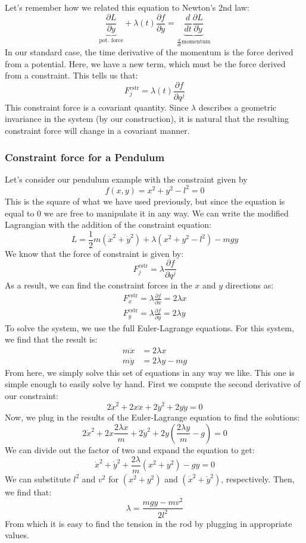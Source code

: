 Let's remember how we related this equation to Newton's 2nd law:
$$\underbrace{\frac{\partial L}{\partial y}}_\text{pot. force}+\lambda(t)\frac{\partial f}{\partial y}=\underbrace{\frac{d}{dt}\frac{\partial L}{\partial \dot{y}}}_{\frac{d}{dt}\text{momentum}}$$
In our standard case, the time derivative of the momentum is the force derived from a potential. Here, we have a new term, which must be the force derived from a constraint. This tells us that:
$$F^\text{cstr}_j=\lambda(t)\frac{\partial f}{\partial q^j}$$
This constraint force is a covariant quantity. Since $\lambda$ describes a geometric invariance in the system (by our construction), it is natural that the resulting constraint force will change in a covariant manner.

\subsubsection{Constraint force for a Pendulum}
Let's consider our pendulum example with the constraint given by
$$f(x,y)={x^2+y^2}-l^2=0$$
This is the square of what we have used previously, but since the equation is equal to 0 we are free to manipulate it in any way. We can write the modified \gls{Lagrangian} with the addition of the constraint equation:
$$L=\frac{1}{2}m(\dot{x}^2+\dot{y}^2)+\lambda(x^2+y^2-l^2)-mgy$$
We know that the force of constraint is given by:
$$F^\text{cstr}_j=\lambda\frac{\partial f}{\partial q^j}$$
As a result, we can find the constraint forces in the $x$ and $y$ directions as:
\begin{gather}
    F^\text{cstr}_x=\lambda\frac{\partial f}{\partial x}=2\lambda x\\
    F^\text{cstr}_y=\lambda\frac{\partial f}{\partial y}=2\lambda y
\end{gather}
To solve the system, we use the full Euler-Lagrange equations. For this system, we find that the result is:
\begin{align}
    m\ddot{x} &= 2\lambda x \\
    m\ddot{y} &= 2\lambda y-mg
\end{align}
From here, we simply solve this set of equations in any way we like. This one is simple enough to easily solve by hand. First we compute the second derivative of our constraint:
$$2\dot{x}^2+2x\ddot{x}+2\dot{y}^2+2y\ddot{y}=0$$
Now, we plug in the results of the Euler-Lagrange equation to find the solutions:
$$2\dot{x}^2+2x\frac{2\lambda x}{m}+2\dot{y}^2+2y\left(\frac{2\lambda y}{m}-g\right)=0$$
We can divide out the factor of two and expand the equation to get:
$$\dot{x}^2+\dot{y}^2+\frac{2\lambda}{m}\left(x^2+y^2\right)-gy=0$$
We can substitute $l^2$ and $v^2$ for $(x^2+y^2)$ and $(\dot{x}^2+\dot{y}^2)$, respectively. Then, we find that:
$$\lambda=\frac{mgy-mv^2}{2l^2}$$
From which it is easy to find the tension in the rod by plugging in appropriate values.

